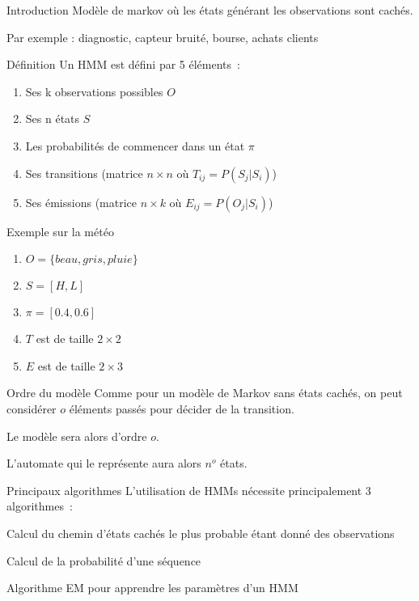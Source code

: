 \begin{frame}{Introduction}
  Modèle de markov où les états générant les observations sont cachés.

  Par exemple : diagnostic, capteur bruité, bourse, achats clients

\end{frame}

\begin{frame}{Définition}
  Un HMM est défini par 5 éléments~:
  \begin{enumerate}[<+->]
  \item Ses k observations possibles $O$
  \item Ses n états $S$
  \item Les probabilités de commencer dans un état $\pi$
  \item Ses transitions (matrice $n\times n$ où $T_{ij} = P(S_j|S_i)$)
  \item Ses émissions (matrice $n\times k$ où $E_{ij} = P(O_j|S_i)$)
  \end{enumerate}
\end{frame}

\begin{frame}{Exemple sur la météo} 
  \begin{enumerate}[<+->]
  \item $O = \{beau,gris,pluie\}$ 
  \item $S =  [H, L]$
  \item $\pi = [0.4, 0.6]$
  \item $T$ est de taille $2 \times 2$ 
  \item $E$ est de taille $2\times 3$
  \end{enumerate}


\end{frame}

\begin{frame}{Ordre du modèle}
  Comme pour un modèle de Markov sans états cachés, on peut considérer $o$ éléments passés pour décider de la transition.

  Le modèle sera alors d'ordre $o$.

  L'automate qui le représente aura alors $n^o$ états.
\end{frame}

\begin{frame}{Principaux algorithmes}
  L'utilisation de HMMs nécessite principalement 3 algorithmes~:

  \begin{description}[<+->]
  \item[Viterbi] Calcul du chemin d'états cachés le plus probable étant donné des observations
  \item[Forward-Backward] Calcul de la probabilité d'une séquence
  \item[Baum-Welch] Algorithme EM pour apprendre les paramètres d'un HMM
  \end{description}
\end{frame}

